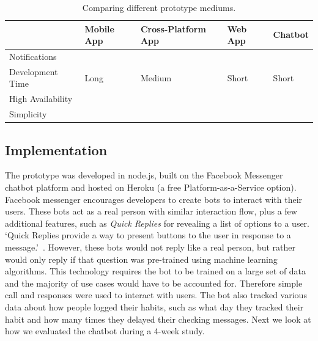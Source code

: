 \documentclass{scaffold/sigchi}
\newcommand{\cmark}{\ding{51}} %
\newcommand{\xmark}{\ding{55}}
\begin{document}
\renewcommand{\arraystretch}{1.5} %
\begin{table}
  \centering
  \begin{tabular}{ p{1.9cm} | p{1.2cm} p{2.1cm} p{1cm} p{1cm} }
 \textbf{} & \textbf{\small{Mobile App}} & \textbf{\small{Cross-Platform App}} & \textbf{\small{Web App}} & \textbf{\small{Chatbot}} \\ \hline
 \small{Notifications} & \cmark & \cmark & \xmark & \cmark \\ 
 \small{Development Time} & \small{Long} & \small{Medium} & \small{Short} & \small{Short} \\ 
 \small{High Availability} & \xmark & \xmark & \cmark & \cmark \\ 
 \small{Simplicity} & \xmark & \xmark & \cmark & \cmark \\
\end{tabular}
    \caption{Comparing different prototype mediums.}
    \label{table:prototype_table}
\end{table}

\subsection{Implementation}


The prototype was developed in node.js, built on the Facebook Messenger chatbot platform and hosted on Heroku (a free Platform-as-a-Service option). Facebook messenger encourages developers to create bots to interact with their users. These bots act as a real person with similar interaction flow, plus a few additional features, such as \textit{Quick Replies} for revealing a list of options to a user. `Quick Replies provide a way to present buttons to the user in response to a message.'~\cite{doc_fb_quick_replies}. However, these bots would not reply like a real person, but rather would only reply if that question was pre-trained using machine learning algorithms. This technology requires the bot to be trained on a large set of data and the majority of use cases would have to be accounted for. Therefore simple call and responses were used to interact with users. The bot also tracked various data about how people logged their habits, such as what day they tracked their habit and how many times they delayed their checking messages. Next we look at how we evaluated the chatbot during a 4-week study.
\end{document}

